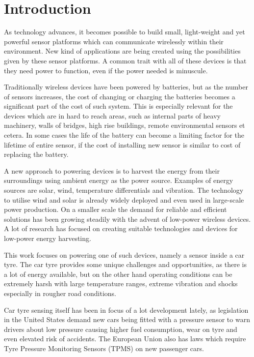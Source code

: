 \section{Introduction}

\thispagestyle{empty}

As technology advances, it becomes possible to build small, light-weight and yet powerful sensor platforms which can communicate wirelessly within their environment. New kind of applications are being created using the possibilities given by these sensor platforms. A common trait with all of these devices is that they need power to function, even if the power needed is minuscule. 

Traditionally wireless devices have been powered by batteries, but as the number of sensors increases, the cost of changing or charging the batteries becomes a significant part of the cost of such system. This is especially relevant for the devices which are in hard to reach areas, such as internal parts of heavy machinery, walls of bridges, high rise buildings, remote environmental sensors et cetera. In some cases the life of the battery can become a limiting factor for the lifetime of entire sensor, if the cost of installing new sensor is similar to cost of replacing the battery.

A new approach to powering devices is to harvest the energy from their surroundings using ambient energy as the power source. Examples of energy sources are solar, wind, temperature differentials and vibration. The technology to utilise wind and solar is already widely deployed and even used in large-scale power production. On a smaller scale the demand for reliable and efficient solutions has been growing steadily with the advent of low-power wireless devices. A lot of research has focused on creating suitable technologies and devices for low-power energy harvesting. 

This work focuses on powering one of such devices, namely a sensor inside a car tyre. The car tyre provides some unique challenges and opportunities, as there is a lot of energy available, but on the other hand operating conditions can be extremely harsh with large temperature ranges, extreme vibration and shocks especially in rougher road conditions.

Car tyre sensing itself has been in focus of a lot development lately, as legislation in the United States demand new cars being fitted with a pressure sensor to warn drivers about low pressure causing higher fuel consumption, wear on tyre and even elevated risk of accidents. The European Union also has laws which require Tyre Pressure Monitoring Sensors (TPMS) on new passenger cars. 

